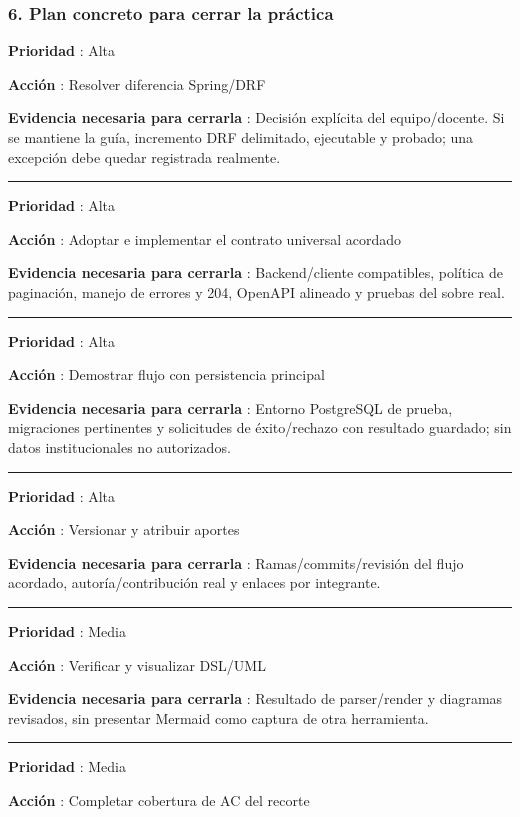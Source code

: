 \documentclass[11pt,a4paper]{article}
\begin{document}
\subsubsection{6. Plan concreto para cerrar la
práctica}\label{revision-guia-6-plan-concreto-para-cerrar-la-pruxe1ctica}

\textbf{Prioridad }: Alta

\textbf{Acción }: Resolver diferencia Spring/DRF

\textbf{Evidencia necesaria para cerrarla }: Decisión explícita del
equipo/docente. Si se mantiene la guía, incremento DRF delimitado,
ejecutable y probado; una excepción debe quedar registrada realmente.

\medskip\hrule\medskip

\textbf{Prioridad }: Alta

\textbf{Acción }: Adoptar e implementar el contrato universal acordado

\textbf{Evidencia necesaria para cerrarla }: Backend/cliente
compatibles, política de paginación, manejo de errores y 204, OpenAPI
alineado y pruebas del sobre real.

\medskip\hrule\medskip

\textbf{Prioridad }: Alta

\textbf{Acción }: Demostrar flujo con persistencia principal

\textbf{Evidencia necesaria para cerrarla }: Entorno PostgreSQL de
prueba, migraciones pertinentes y solicitudes de éxito/rechazo con
resultado guardado; sin datos institucionales no autorizados.

\medskip\hrule\medskip

\textbf{Prioridad }: Alta

\textbf{Acción }: Versionar y atribuir aportes

\textbf{Evidencia necesaria para cerrarla }: Ramas/commits/revisión del
flujo acordado, autoría/contribución real y enlaces por integrante.

\medskip\hrule\medskip

\textbf{Prioridad }: Media

\textbf{Acción }: Verificar y visualizar DSL/UML

\textbf{Evidencia necesaria para cerrarla }: Resultado de parser/render
y diagramas revisados, sin presentar Mermaid como captura de otra
herramienta.

\medskip\hrule\medskip

\textbf{Prioridad }: Media

\textbf{Acción }: Completar cobertura de AC del recorte
\end{document}
